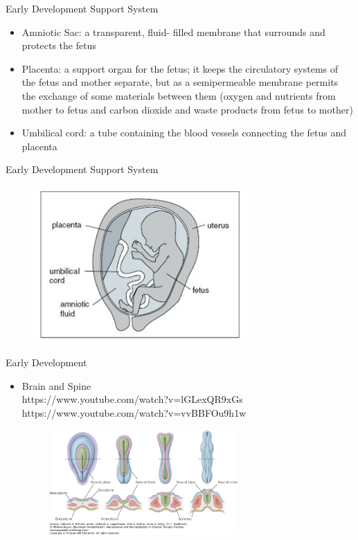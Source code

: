 \documentclass{beamer} %
\begin{document}
\begin{frame}{Early Development}
Support System
\begin{itemize}
    \item Amniotic Sac: a transparent, fluid- filled membrane that surrounds and protects the fetus
    \item Placenta: a support organ for the fetus; it keeps the circulatory systems of the fetus and mother separate, but
    as a semipermeable membrane permits the exchange of some materials between them (oxygen and nutrients from mother to fetus and carbon dioxide and waste products from fetus to mother)
    \item Umbilical cord: a tube containing the blood vessels connecting the fetus and placenta
\end{itemize}
\end{frame}
\begin{frame}{Early Development}
Support System
\begin{figure}
    \centering
    \includegraphics[width=\textwidth,height=6cm]{amniotickey.jpg}
\end{figure}
\end{frame}
\begin{frame}{Early Development}
\begin{itemize}
    \item Brain and Spine
    \\ https://www.youtube.com/watch?v=lGLexQR9xGs
    \\ https://www.youtube.com/watch?v=vvBBFOu9h1w
    \begin{figure}
        \centering
        \includegraphics[width=\linewidth,height=4cm]{larsen_ch18_fig-18-04.png}
    \end{figure}
\end{itemize}
\end{frame}
\end{document}
